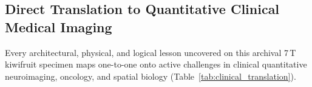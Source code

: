 \documentclass[10pt,a4paper]{article}
\renewcommand{\_}{\origunderscore\allowbreak}
\begin{document}

\subsection{Direct Translation to Quantitative Clinical Medical Imaging}
\label{sec:disc_clinical}

Every architectural, physical, and logical lesson uncovered on this archival 7\,T kiwifruit specimen maps one-to-one onto active challenges in clinical quantitative neuroimaging, oncology, and spatial biology (Table~\ref{tab:clinical_translation}).
\end{document}
